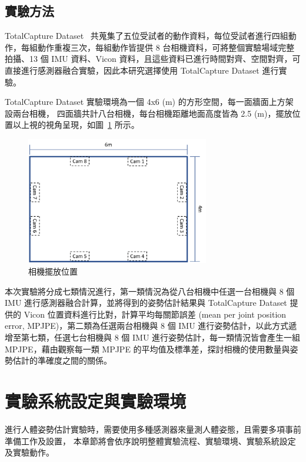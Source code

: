 \subsection{實驗方法}
TotalCapture Dataset~\cite{Trumble:BMVC:2017} 共蒐集了五位受試者的動作資料，每位受試者進行四組動作，每組動作重複三次，每組動作皆提供 8 台相機資料，可將整個實驗場域完整拍攝、13 個 IMU 資料、Vicon 資料，且這些資料已進行時間對齊、空間對齊，可直接進行感測器融合實驗，因此本研究選擇使用 TotalCapture Dataset 進行實驗。

TotalCapture Dataset 實驗環境為一個 4x6 (m) 的方形空間，每一面牆面上方架設兩台相機，
四面牆共計八台相機，每台相機距離地面高度皆為 2.5 (m)，擺放位置以上視的視角呈現，如圖~\ref{ch3_fig_cameraset_totalcap} 所示。

\begin{figure}[!ht]
   \centering
   \includegraphics[width=8cm]{figure/ch3_fig_cameraset_totalcap.png}
    \caption[相機擺放位置]{相機擺放位置}
    \label{ch3_fig_cameraset_totalcap}
\end{figure}

本次實驗將分成七類情況進行，第一類情況為從八台相機中任選一台相機與 8 個 IMU 進行感測器融合計算，並將得到的姿勢估計結果與 TotalCapture Dataset 提供的 Vicon 位置資料進行比對，計算平均每關節誤差 (mean per joint position error, MPJPE)，第二類為任選兩台相機與 8 個 IMU 進行姿勢估計，以此方式遞增至第七類，任選七台相機與 8 個 IMU 進行姿勢估計，每一類情況皆會產生一組 MPJPE，藉由觀察每一類 MPJPE 的平均值及標準差，探討相機的使用數量與姿勢估計的準確度之間的關係。

\section{實驗系統設定與實驗環境}\label{ch3_exp_setting}
進行人體姿勢估計實驗時，需要使用多種感測器來量測人體姿態，且需要多項事前準備工作及設置，
本章節將會依序說明整體實驗流程、實驗環境、實驗系統設定及實驗動作。

